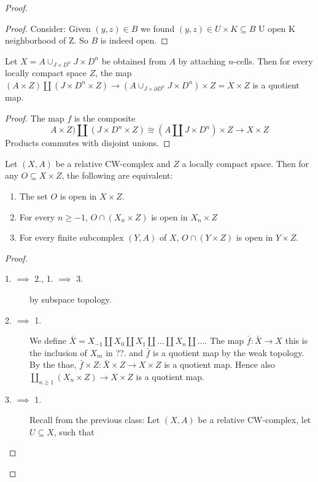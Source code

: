 \documentclass{TemplateLecture}
\begin{document}
\begin{proof}
\begin{proof}
        Consider: Given \((y,z) \in B\) we found
        \((y,z) \in U\times K \subseteq B\) U open K neighborhood of Z.
        So \(B\) is indeed open.
    \end{proof}
    \begin{corollary}
        Let \(X = A \cup_{J\times D^n} J\times D^n\) be obtained from \(A\) by attaching \(n\)-cells. Then for every locally compact space \(Z\), the map \((A\times Z) \amalg (J\times D^n \times Z) \to (A \cup_{J\times \partial D^n} J\times D^n) \times Z = X \times Z\) is a quotient map.
    \end{corollary}
    \begin{proof}
        The map \(f\) is the composite
        \[A\times Z) \amalg (J\times D^n \times Z) \cong (A \amalg J\times D^n) \times Z \to X\times Z\]
        Products commutes with disjoint unions.
    \end{proof}
    \begin{corollary}
        Let \((X,A)\) be a relative CW-complex and \(Z\) a locally compact space. Then for any \(O \subseteq X \times Z\), the following are equivalent:
        \begin{enumerate}
            \item The set \(O\) is open in \(X\times Z\).
            \item For every \(n \geq -1\), \(O\cap (X_n \times Z)\) is open in \(X_n \times Z\)
            \item For every finite subcomplex \((Y,A)\) of \(X\), \(O\cap (Y \times Z)\) is open in \(Y \times Z\).
        \end{enumerate}
    \end{corollary}
    \begin{proof}
        \begin{description}
            \item[1. \(\implies\) 2., 1. \(\implies\) 3.] by subspace topology.
            \item[2. \(\implies\) 1.] We define \(\bar X = X_{-1} \amalg X_0 \amalg X_1 \amalg \dots \amalg X_n \amalg \dots\). The map \(\bar f\colon \bar X \to X\) this is the inclusion of \(X_m\) in ??. and \(\bar f\) is a quotient map by the weak topology.
            By the thae, \(\bar f\times Z\colon \bar X \times Z \to X \times Z\) is a quotient map.
            Hence also \(\coprod_{n \geq 1} (X_n \times Z) \to X \times Z\) is a quotient map. %
            \item[3. \(\implies\) 1.] Recall from the previous class: Let \((X,A)\) be a relative CW-complex, let \(U \subseteq X\), such that\begin{itemize}

\end{itemize}
\end{description}
\end{proof}
\end{proof}
\end{document}
